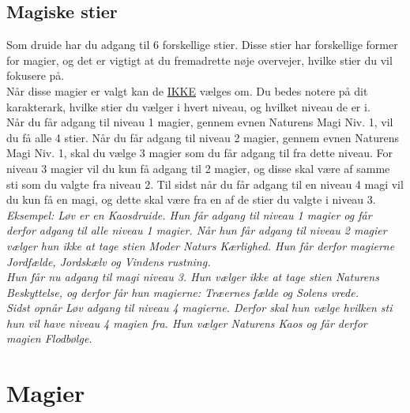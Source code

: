 \section{Magiske stier}
Som druide har du adgang til 6 forskellige stier. Disse stier har forskellige former for magier, og det er vigtigt at du fremadrette nøje overvejer, hvilke stier du vil fokusere på.\\
Når disse magier er valgt kan de \underline{IKKE} vælges om. Du bedes notere på dit karakterark, hvilke stier du vælger i hvert niveau, og hvilket niveau de er i.\\
Når du får adgang til niveau 1 magier, gennem evnen Naturens Magi Niv. 1, vil du få alle 4 stier. Når du får adgang til niveau 2 magier, gennem evnen Naturens Magi Niv. 1, skal du vælge 3 magier som du får adgang til fra dette niveau. For niveau 3 magier vil du kun få adgang til 2 magier, og disse skal være af samme sti som du valgte fra niveau 2. Til sidst når du får adgang til en niveau 4 magi vil du kun få en magi, og dette skal være fra en af de stier du valgte i niveau 3. \\
\textit{Eksempel: Løv er en Kaosdruide. Hun får adgang til niveau 1 magier og får derfor adgang til alle niveau 1 magier. Når hun får adgang til niveau 2 magier vælger hun ikke at tage stien Moder Naturs Kærlighed. Hun får derfor magierne Jordfælde, Jordskælv og Vindens rustning.\\
Hun får nu adgang til magi niveau 3. Hun vælger ikke at tage stien Naturens Beskyttelse, og derfor får hun magierne: Træernes fælde og Solens vrede.\\
Sidst opnår Løv adgang til niveau 4 magierne. Derfor skal hun vælge hvilken sti hun vil have niveau 4 magien fra. Hun vælger Naturens Kaos og får derfor magien Flodbølge.\\}

\chapter{Magier}

